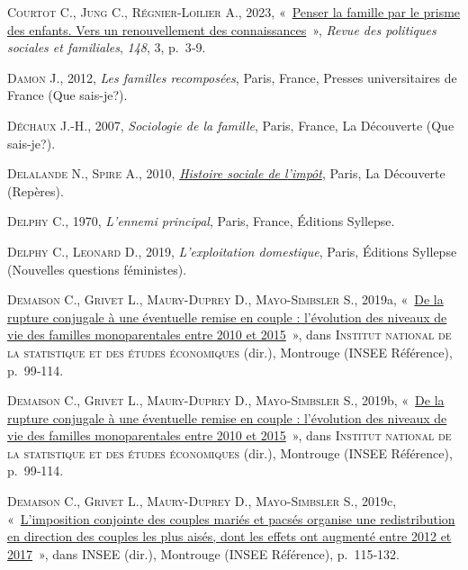 \documentclass[
  12pt,
]{book}
\newlength{\cslhangindent}
\newenvironment{CSLReferences}[2] %
 {\begin{list}{}{%
  \setlength{\itemindent}{0pt}
  \setlength{\leftmargin}{0pt}
  \setlength{\parsep}{0pt}
  \ifodd #1
   \setlength{\leftmargin}{\cslhangindent}
   \setlength{\itemindent}{-1\cslhangindent}
  \fi
  \setlength{\itemsep}{#2\baselineskip}}}
 {\end{list}}
\begin{document}
\begin{CSLReferences}{0}{1}
\textsc{Courtot C.}, \textsc{Jung C.}, \textsc{Régnier-Loilier A.},
2023, {«~\href{https://doi.org/10.3917/rpsf.148.0003}{Penser la famille
par le prisme des enfants. Vers un renouvellement des connaissances}~»},
\emph{Revue des politiques sociales et familiales}, \emph{148}, 3,
p.~3‑9.

\textsc{Damon J.}, 2012, \emph{Les familles recomposées}, Paris, France,
Presses universitaires de France (Que sais-je?).

\textsc{Déchaux J.-H.}, 2007, \emph{Sociologie de la famille}, Paris,
France, La Découverte (Que sais-je?).

\textsc{Delalande N.}, \textsc{Spire A.}, 2010,
\emph{\href{https://www.cairn.info/histoire-sociale-de-l-impot--9782707157164.htm}{Histoire
sociale de l{'}impôt}}, Paris, La Découverte (Repères).

\textsc{Delphy C.}, 1970, \emph{L'ennemi principal}, Paris, France,
Éditions Syllepse.

\textsc{Delphy C.}, \textsc{Leonard D.}, 2019, \emph{L'exploitation
domestique}, Paris, Éditions Syllepse (Nouvelles questions féministes).

\textsc{Demaison C.}, \textsc{Grivet L.}, \textsc{Maury-Duprey D.},
\textsc{Mayo-Simbsler S.}, 2019a,
{«~\href{https://www.insee.fr/fr/statistiques/4238781}{De la rupture
conjugale à une éventuelle remise en couple : l{'}évolution des niveaux
de vie des familles monoparentales entre 2010 et 2015}~»}, dans
\textsc{Institut national de la statistique et des études économiques}
(dir.), Montrouge (INSEE Référence), p.~99‑114.

\textsc{Demaison C.}, \textsc{Grivet L.}, \textsc{Maury-Duprey D.},
\textsc{Mayo-Simbsler S.}, 2019b,
{«~\href{https://www.insee.fr/fr/statistiques/4238781}{De la rupture
conjugale à une éventuelle remise en couple : l{'}évolution des niveaux
de vie des familles monoparentales entre 2010 et 2015}~»}, dans
\textsc{Institut national de la statistique et des études économiques}
(dir.), Montrouge (INSEE Référence), p.~99‑114.

\textsc{Demaison C.}, \textsc{Grivet L.}, \textsc{Maury-Duprey D.},
\textsc{Mayo-Simbsler S.}, 2019c,
{«~\href{https://www.insee.fr/fr/statistiques/4238781}{L{'}imposition
conjointe des couples mariés et pacsés organise une redistribution en
direction des couples les plus aisés, dont les effets ont augmenté entre
2012 et 2017}~»}, dans \textsc{INSEE} (dir.), Montrouge (INSEE
Référence), p.~115‑132.


\end{CSLReferences}
\end{document}
